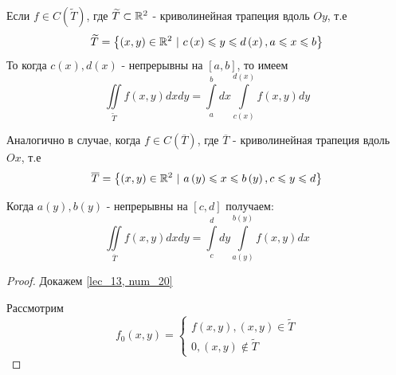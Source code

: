 \documentclass[../../main.tex]{subfiles}
\begin{document}
\begin{crl}
	Если $ f \in C \left( \widetilde{T} \right) $, где $ \widetilde{T} \subset \mathbb{R}^2 $ - 
	криволинейная трапеция вдоль $ Oy $, т.е 
	\begin{equation}
	\label{lec_13, num_19}
	\widetilde{T} = \left\lbrace 
	\left( x, y\right) \in \mathbb{R}^2\ | \ c \left( x \right) \leqslant y \leqslant d \left( x \right),
	 a \leqslant x \leqslant b \right\rbrace
	 \end{equation}
	 То когда $c \left( x \right), d \left( x \right) $ - непрерывны на 
	 $ \left[ a, b \right] $, то имеем
	 \begin{equation}
	 \label{lec_13, num_20}
	 \iint\limits_{\widetilde{T}} f \left( x, y \right)  dxdy = 
	 \int\limits_a^b dx \int\limits_{c \left( x \right) }^{ d \left( x \right) } 
	 f \left( x, y \right) dy
	 \end{equation}
	 
	 Аналогично в случае, когда $ f \in C \left( \overline{T} \right) $, где $ \overline{T} $ - 
	 криволинейная трапеция вдоль $ Ox $, т.е 
	 \begin{equation}
	 \label{lec_13, num_21}
	 \overline{T} = \left\lbrace 
	 \left( x, y\right) \in \mathbb{R}^2\ | \ a \left( y \right) \leqslant x \leqslant b \left( y \right),
	 c \leqslant y \leqslant d \right\rbrace
	 \end{equation}
	 
	 Когда $ a \left( y \right), b \left( y \right) $ - непрерывны на $ \left[ c, d \right] $
	 получаем:
	 \begin{equation}
	 \label{lec_13, num_22}
	 \iint\limits_{\overline{T}} f \left( x, y \right) dx dy = \int\limits_c^d dy 
	 \int\limits_{a \left( y \right) } ^ {b \left( y \right) } f \left( x, y \right) dx
	 \end{equation}
\end{crl}

\begin{proof}
	Докажем \eqref {lec_13, num_20} 
	
	Рассмотрим 
	\[ 
	f_0 \left( x, y \right) =  
	\begin{cases}
	f \left( x, y \right),  \left( x, y \right) \in \widetilde{T} \\
	0, \left( x, y \right) \notin \widetilde{T}
	\end{cases}
	\]
\end{proof}
\end{document}
